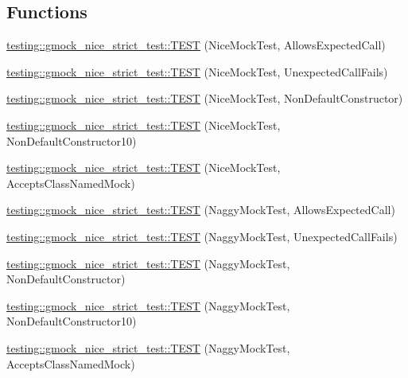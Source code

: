 \subsection*{Functions}
\begin{DoxyCompactItemize}
\item 
\hyperlink{namespacetesting_1_1gmock__nice__strict__test_a12b9f686345faa5a646da65a67c38a44}{testing\+::gmock\+\_\+nice\+\_\+strict\+\_\+test\+::\+T\+E\+ST} (Nice\+Mock\+Test, Allows\+Expected\+Call)
\item 
\hyperlink{namespacetesting_1_1gmock__nice__strict__test_a2bad58b3a12ea95eb4a731026c576b40}{testing\+::gmock\+\_\+nice\+\_\+strict\+\_\+test\+::\+T\+E\+ST} (Nice\+Mock\+Test, Unexpected\+Call\+Fails)
\item 
\hyperlink{namespacetesting_1_1gmock__nice__strict__test_a4172e1193c21d61e34d9b2c379d2f6be}{testing\+::gmock\+\_\+nice\+\_\+strict\+\_\+test\+::\+T\+E\+ST} (Nice\+Mock\+Test, Non\+Default\+Constructor)
\item 
\hyperlink{namespacetesting_1_1gmock__nice__strict__test_a81bfeea94824935648545225f5dd3c00}{testing\+::gmock\+\_\+nice\+\_\+strict\+\_\+test\+::\+T\+E\+ST} (Nice\+Mock\+Test, Non\+Default\+Constructor10)
\item 
\hyperlink{namespacetesting_1_1gmock__nice__strict__test_a0a43059a52437e547c8fb836008b8e60}{testing\+::gmock\+\_\+nice\+\_\+strict\+\_\+test\+::\+T\+E\+ST} (Nice\+Mock\+Test, Accepts\+Class\+Named\+Mock)
\item 
\hyperlink{namespacetesting_1_1gmock__nice__strict__test_a8ae416186af77fc0d066467be92c6c86}{testing\+::gmock\+\_\+nice\+\_\+strict\+\_\+test\+::\+T\+E\+ST} (Naggy\+Mock\+Test, Allows\+Expected\+Call)
\item 
\hyperlink{namespacetesting_1_1gmock__nice__strict__test_a475ee57b7b86f3f81d50819db3dd78b4}{testing\+::gmock\+\_\+nice\+\_\+strict\+\_\+test\+::\+T\+E\+ST} (Naggy\+Mock\+Test, Unexpected\+Call\+Fails)
\item 
\hyperlink{namespacetesting_1_1gmock__nice__strict__test_a9618de98b38e8e4270873d9b2616e3e1}{testing\+::gmock\+\_\+nice\+\_\+strict\+\_\+test\+::\+T\+E\+ST} (Naggy\+Mock\+Test, Non\+Default\+Constructor)
\item 
\hyperlink{namespacetesting_1_1gmock__nice__strict__test_a982de09f3040cc5b9f457a7aa4e00652}{testing\+::gmock\+\_\+nice\+\_\+strict\+\_\+test\+::\+T\+E\+ST} (Naggy\+Mock\+Test, Non\+Default\+Constructor10)
\item 
\hyperlink{namespacetesting_1_1gmock__nice__strict__test_af147980581baec3cf492457c2d1e0276}{testing\+::gmock\+\_\+nice\+\_\+strict\+\_\+test\+::\+T\+E\+ST} (Naggy\+Mock\+Test, Accepts\+Class\+Named\+Mock)

\end{DoxyCompactItemize}

